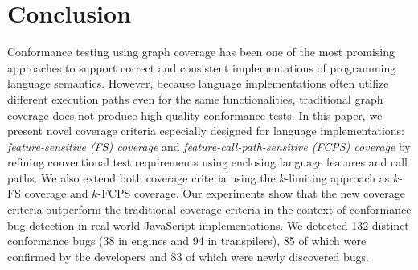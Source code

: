 \section{Conclusion}\label{sec:conclusion}
Conformance testing using graph coverage has been one of the most
promising approaches to support correct and consistent implementations
of programming language semantics.
However, because language implementations often utilize 
different execution paths even for the same functionalities,
traditional graph coverage does not produce high-quality conformance tests.
In this paper, we present novel coverage criteria especially designed
for language implementations: \textit{feature-sensitive (FS) coverage} and
\textit{feature-call-path-sensitive (FCPS) coverage}
by refining conventional test requirements using
enclosing language features and call paths.
We also extend both coverage criteria using the $k$-limiting approach as
$k$-FS coverage and $k$-FCPS coverage.
Our experiments show that the new coverage criteria outperform the
traditional coverage criteria in the context of conformance bug detection in
real-world JavaScript implementations.
We detected 132 distinct conformance bugs (38 in engines
and 94 in transpilers), 85 of which were confirmed by the
developers and 83 of which were newly discovered bugs.
